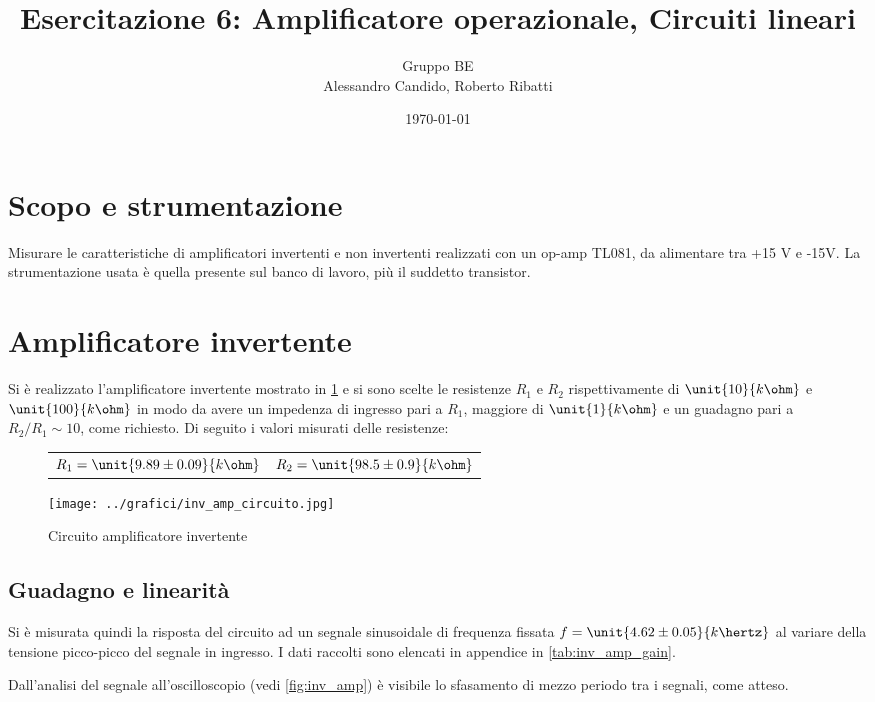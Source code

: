 \documentclass[10pt,a4paper]{article}
\title{Esercitazione 6: Amplificatore operazionale, Circuiti lineari}
\author{Gruppo BE \\ Alessandro Candido, Roberto Ribatti}
\date{\today}
\begin{document}
\maketitle

\section{Scopo e strumentazione}
Misurare le caratteristiche di amplificatori invertenti e non invertenti realizzati con un op-amp TL081, da alimentare tra +15 V e -15V.
La strumentazione usata è quella presente sul banco di lavoro, più il suddetto transistor.

\section{Amplificatore invertente}
Si è realizzato l'amplificatore invertente mostrato in \figurename{\ref{circuito_amp_inv}} e si sono scelte le resistenze $R_1$ e $R_2$ rispettivamente di $\unit{10}{k\ohm}$ e $\unit{100}{k\ohm}$ in modo da avere un impedenza di ingresso pari a $R_1$, maggiore di $\unit{1}{k\ohm}$ e un guadagno pari a $R_2/R_1 \sim 10$, come richiesto. Di seguito i valori misurati delle resistenze:
\begin{figure}[H]
\begin{minipage}{0.49\textwidth}
	\centering
	\begin{tabular}{cc}
		$R_1 = \unit{9.89 \pm 0.09}{k\ohm}$  & $R_2 = \unit{98.5 \pm 0.9}{k\ohm}$
	\end{tabular}
\end{minipage}
\begin{minipage}{0.49\textwidth}
	\centering
	\texttt{[image: ../grafici/inv\_amp\_circuito.jpg]}
	\caption{Circuito amplificatore invertente}
	\label{circuito_amp_inv}
\end{minipage}
\end{figure}

\subsection{Guadagno e linearità}
Si è misurata quindi la risposta del circuito ad un segnale sinusoidale di frequenza fissata $f = \unit{4.62 \pm 0.05}{k\hertz}$ al variare della tensione picco-picco del segnale in ingresso. I dati raccolti sono elencati in appendice in \tablename{\ref{tab:inv_amp_gain}}.

Dall'analisi del segnale all'oscilloscopio (vedi \figurename{\ref{fig:inv_amp}}) è visibile lo sfasamento di mezzo periodo tra i segnali, come atteso.
\end{document}
